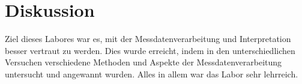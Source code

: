 \chapter{Diskussion}

Ziel dieses Labores war es, mit der Messdatenverarbeitung und Interpretation
besser vertraut zu werden. Dies wurde erreicht, indem in den unterschiedlichen 
Versuchen verschiedene Methoden und Aspekte der Messdatenverarbeitung 
untersucht und angewannt wurden. Alles in allem war das Labor sehr lehrreich.